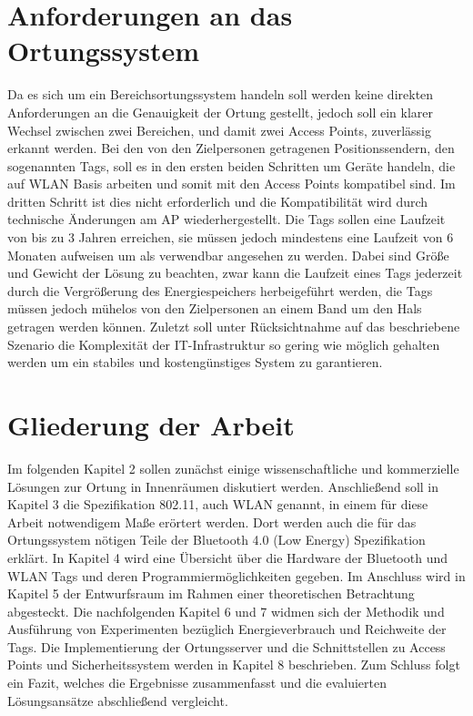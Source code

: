 \section{Anforderungen an das Ortungssystem}
\label{ch:Einleitung:sec:Anforderungen}
Da es sich um ein Bereichsortungssystem handeln soll werden keine direkten Anforderungen an die Genauigkeit der Ortung gestellt, jedoch soll ein klarer Wechsel zwischen zwei Bereichen, und damit zwei Access Points, zuverlässig erkannt werden. 
Bei den von den Zielpersonen getragenen Positionssendern, den sogenannten Tags, soll es in den ersten beiden Schritten um Geräte handeln, die auf WLAN Basis arbeiten und somit mit den Access Points kompatibel sind.
Im dritten Schritt ist dies nicht erforderlich und die Kompatibilität wird durch technische Änderungen am AP wiederhergestellt.
Die Tags sollen eine Laufzeit von bis zu 3 Jahren erreichen, sie müssen jedoch mindestens eine Laufzeit von 6 Monaten aufweisen um als verwendbar angesehen zu werden. 
Dabei sind Größe und Gewicht der Lösung zu beachten, zwar kann die Laufzeit eines Tags jederzeit durch die Vergrößerung des Energiespeichers herbeigeführt werden, die Tags müssen jedoch mühelos von den Zielpersonen an einem Band um den Hals getragen werden können.
Zuletzt soll unter Rücksichtnahme auf das beschriebene Szenario die Komplexität der IT-Infrastruktur so gering wie möglich gehalten werden um ein stabiles und kostengünstiges System zu garantieren. 

\section{Gliederung der Arbeit}
\label{ch:Einleitung:sec:Gliederung}
Im folgenden Kapitel 2 sollen zunächst einige wissenschaftliche und kommerzielle Lösungen zur Ortung in Innenräumen diskutiert werden. 
Anschließend soll in Kapitel 3 die Spezifikation 802.11, auch WLAN genannt, in einem für diese Arbeit notwendigem Maße erörtert werden. Dort werden auch die für das Ortungssystem nötigen Teile der Bluetooth 4.0 (Low Energy) Spezifikation erklärt. 
In Kapitel 4 wird eine Übersicht über die Hardware der Bluetooth und WLAN Tags und deren Programmiermöglichkeiten gegeben. 
Im Anschluss wird in Kapitel 5 der Entwurfsraum im Rahmen einer theoretischen Betrachtung abgesteckt. 
Die nachfolgenden Kapitel 6 und 7 widmen sich der Methodik und Ausführung von Experimenten bezüglich Energieverbrauch und Reichweite der Tags.
Die Implementierung der Ortungsserver und die Schnittstellen zu Access Points und Sicherheitssystem werden in Kapitel 8 beschrieben.
Zum Schluss folgt ein Fazit, welches die Ergebnisse zusammenfasst und die evaluierten Lösungsansätze abschließend vergleicht.

